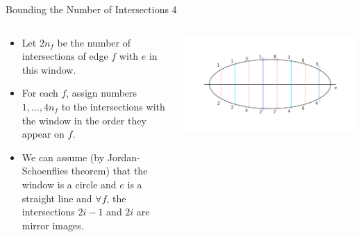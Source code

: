 \documentclass[10pt,aspectratio=169]{beamer}
\theoremstyle{plain}
\begin{document}
\begin{frame}{Bounding the Number of Intersections 4}
    \begin{columns}
    \begin{column}{0.35\textwidth}
        \begin{itemize}
            \item Let \(2n_f\) be the number of intersections of edge \(f\) with \(e\) in this window.
            \item<2-> For each \(f\), assign numbers \(1, \ldots, 4 n_f\) to the intersections with the window in the order they appear on \(f\).
            \item<3-> We can assume (by Jordan-Schoenflies theorem) that the window is a circle and \(e\) is a straight line and \(\forall f\), the intersections \(2i-1\) and \(2i\) are mirror images.
        \end{itemize}
    \end{column}
    \begin{column}{0.65\textwidth}
        \begin{center}
            \includegraphics[width=\textwidth]{images/figure-5.pdf}
        \end{center}
    \end{column}
    \end{columns}
\end{frame}
\end{document}
